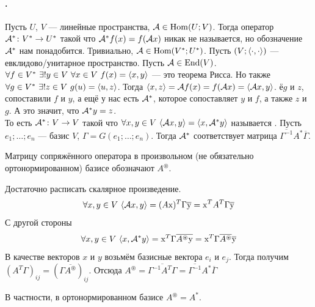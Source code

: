 \documentclass{article}
\begin{document}
    \paragraph{.}
    \begin{itemize}
        \dfn Пусть $U$, $V$ --- линейные пространства, ${\mathcal{A}}\in\operatorname{Hom}(U;V)$. Тогда оператор ${\mathcal{A}}^*\colon V^*\to U^*$ такой что ${\mathcal{A}}^*f(x)=f({\mathcal{A}} x)$ никак не называется, но обозначение ${\mathcal{A}}^*$ нам понадобится.
        \thm Тривиально, ${\mathcal{A}}\in\operatorname{Hom}(V^*;U^*)$.
        \dfn Пусть $(V;{\left\langle{\cdot},{\cdot}\right\rangle})$ --- евклидово/унитарное пространство. Пусть ${\mathcal{A}}\in\operatorname{End}(V)$. $\forall f\in V^*~\exists!y\in V~\forall x\in V~f(x)={\left\langle{x},{y}\right\rangle}$ --- это теорема Рисса. Но также $\forall g\in V^*~\exists!z\in V~g(u)={\left\langle{u},{z}\right\rangle}$. Тогда ${\left\langle{x},{z}\right\rangle}={\mathcal{A}} f(x)=f({\mathcal{A}} x)={\left\langle{{\mathcal{A}}x},{y}\right\rangle}$. ё$g$ и $z$, сопоставили $f$ и $y$, а ещё у нас есть ${\mathcal{A}}^*$, которое сопоставляет $y$ и $f$, а также $z$ и $g$. А это значит, что ${\mathcal{A}}^*y=z$.\\
        То есть ${\mathcal{A}}^*\colon V\to V$ такой что $\forall x,y\in V~{\left\langle{{\mathcal{A}}x},{y}\right\rangle}={\left\langle{x},{{\mathcal{A}}^*y}\right\rangle}$ называется .
        \thm Пусть $e_1;\ldots;e_n$ --- базис $V$, $\Gamma=G(e_1;\ldots;e_n)$. Тогда ${\mathcal{A}}^*$ соответствует матрица $\overline{\Gamma^{-1}}A^*\overline\Gamma$.
        \begin{Comment}
            Матрицу сопряжённого оператора в произвольном (не обязательно ортонормированном) базисе обозначают $A^\circledast$.
        \end{Comment}
        \begin{Proof}
            Достаточно расписать скалярное произведение.
            $$
            \forall x,y\in V~{\left\langle{{\mathcal{A}}x},{y}\right\rangle}=(A\mathrm x)^T\Gamma\overline{\mathrm y}=\mathrm x^TA^T\Gamma\overline{\mathrm y}
            $$
            С другой стороны
            $$
            \forall x,y\in V~{\left\langle{x},{{\mathcal{A}}^*y}\right\rangle}=\mathrm x^T\Gamma\overline{A^\circledast\mathrm y}=\mathrm x^T\Gamma\overline{A^\circledast}\overline{\mathrm y}
            $$
            В качестве векторов $x$ и $y$ возьмём базисные вектора $e_i$ и $e_j$. Тогда получим $(A^T\Gamma)_{ij}=(\Gamma\overline{A^\circledast})_{ij}$. Отсюда $A^\circledast=\overline{\Gamma^{-1}A^T\Gamma}=\overline{\Gamma^{-1}}A^*\overline{\Gamma}$
        \end{Proof}
        \begin{Comment}
            В частности, в ортонормированном базисе $A^\circledast=A^*$.

\end{Comment}
\end{itemize}
\end{document}
